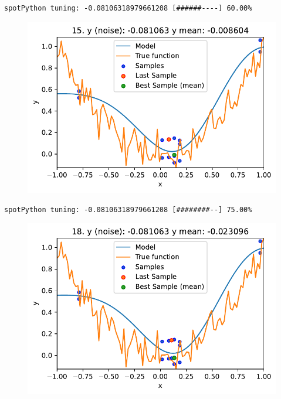 \documentclass[
  letterpaper,
  DIV=11,
  numbers=noendperiod]{scrreprt}
\begin{document}
\begin{verbatim}
spotPython tuning: -0.08106318979661208 [######----] 60.00% 
\end{verbatim}

\begin{figure}[H]

{\centering \includegraphics{09_spot_ocba_files/figure-pdf/cell-6-output-6.pdf}

}

\end{figure}

\begin{verbatim}
spotPython tuning: -0.08106318979661208 [########--] 75.00% 
\end{verbatim}

\begin{figure}[H]

{\centering \includegraphics{09_spot_ocba_files/figure-pdf/cell-6-output-8.pdf}

}

\end{figure}
\end{document}
